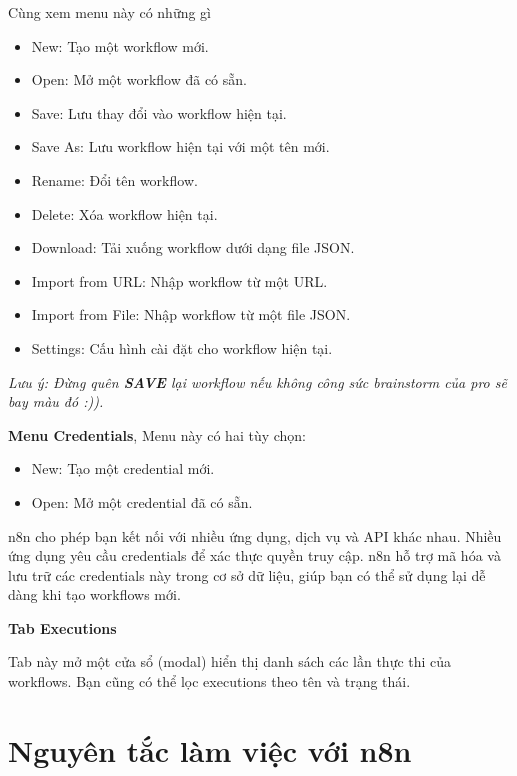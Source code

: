Cùng xem menu này có những gì
\begin{itemize}
    \item New: Tạo một workflow mới.

    \item Open: Mở một workflow đã có sẵn.

    \item Save: Lưu thay đổi vào workflow hiện tại.

    \item Save As: Lưu workflow hiện tại với một tên mới.

    \item Rename: Đổi tên workflow.

    \item Delete: Xóa workflow hiện tại.

    \item Download: Tải xuống workflow dưới dạng file JSON.

    \item Import from URL: Nhập workflow từ một URL.

    \item Import from File: Nhập workflow từ một file JSON.

    \item Settings: Cấu hình cài đặt cho workflow hiện tại.
\end{itemize}

\textit{Lưu ý: Đừng quên \textbf{SAVE} lại workflow nếu không công sức brainstorm của pro sẽ bay màu đó :)).}

\textbf{Menu Credentials}, Menu này có hai tùy chọn:
\begin{itemize}
    \item New: Tạo một credential mới.

    \item Open: Mở một credential đã có sẵn.
\end{itemize}

n8n cho phép bạn kết nối với nhiều ứng dụng, dịch vụ và API khác nhau. Nhiều ứng dụng yêu cầu credentials để xác thực quyền truy cập. n8n hỗ trợ mã hóa và lưu trữ các credentials này trong cơ sở dữ liệu, giúp bạn có thể sử dụng lại dễ dàng khi tạo workflows mới.

\textbf{Tab Executions}

Tab này mở một cửa sổ (modal) hiển thị danh sách các lần thực thi của workflows. Bạn cũng có thể lọc executions theo tên và trạng thái.

\newpage
\section{Nguyên tắc làm việc với n8n}

